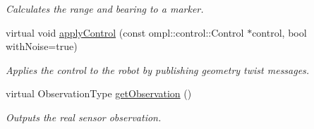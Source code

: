 \begin{DoxyCompactItemize}
\begin{DoxyCompactList}\small\item\em Calculates the range and bearing to a marker. \end{DoxyCompactList}\item 
\hypertarget{classfirm_1_1_r_o_s_space_information_ae9f47c1874ef70bbe6ff2aefc73bb395}{virtual void \hyperlink{classfirm_1_1_r_o_s_space_information_ae9f47c1874ef70bbe6ff2aefc73bb395}{apply\-Control} (const ompl\-::control\-::\-Control $\ast$control, bool with\-Noise=true)}\label{classfirm_1_1_r_o_s_space_information_ae9f47c1874ef70bbe6ff2aefc73bb395}

\begin{DoxyCompactList}\small\item\em Applies the control to the robot by publishing geometry twist messages. \end{DoxyCompactList}\item 
\hypertarget{classfirm_1_1_r_o_s_space_information_ad7cf4b7baabcc90789a2d24c278f5447}{virtual Observation\-Type \hyperlink{classfirm_1_1_r_o_s_space_information_ad7cf4b7baabcc90789a2d24c278f5447}{get\-Observation} ()}\label{classfirm_1_1_r_o_s_space_information_ad7cf4b7baabcc90789a2d24c278f5447}

\begin{DoxyCompactList}\small\item\em Outputs the real sensor observation. \end{DoxyCompactList}\end{DoxyCompactItemize}
